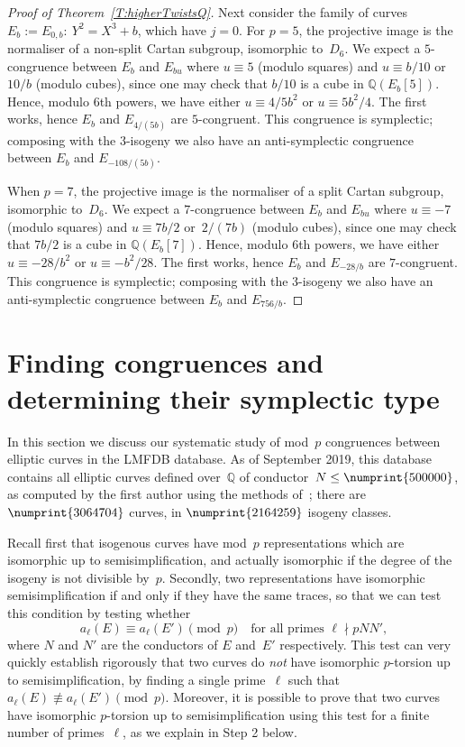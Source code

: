 \documentclass[twoside,leqno,symbols-for-thanks, draft]{rmi}
\numberwithin{equation}{section}
\newcommand{\Q}{\mathbb{Q}}
\theoremstyle{remark}
\begin{document}
\begin{proof}[Proof of Theorem~\ref{T:higherTwistsQ}]
Next consider the family of curves $E_b:=E_{0,b}:\ Y^2=X^3+b$, which
have $j=0$. For $p=5$, the projective image is the normaliser of a
non-split Cartan subgroup, isomorphic to~$D_6$.  We expect a $5$-congruence
between $E_b$ and $E_{bu}$ where $u\equiv5$ (modulo squares) and
$u\equiv b/10$ or~$10/b$ (modulo cubes), since one may check that
$b/10$ is a cube in $\Q(E_b[5])$.  Hence, modulo $6$th powers, we have
either $u\equiv 4/5b^2$ or $u\equiv 5b^2/4$.  The first works, hence
$E_b$ and $E_{4/(5b)}$ are $5$-congruent.  This congruence is
symplectic; composing with the $3$-isogeny we also have an
anti-symplectic congruence between $E_b$ and $E_{-108/(5b)}$.

When $p=7$, the projective image is the normaliser of a split Cartan
subgroup, isomorphic to~$D_6$.  We expect a $7$-congruence between
$E_b$ and $E_{bu}$ where $u\equiv-7$ (modulo squares) and $u\equiv
7b/2$ or~$2/(7b)$ (modulo cubes), since one may check that $7b/2$ is a
cube in $\Q(E_b[7])$.  Hence, modulo $6$th powers, we have either
$u\equiv -28/b^2$ or $u\equiv -b^2/28$.  The first works, hence $E_b$
and $E_{-28/b}$ are $7$-congruent.  This congruence is symplectic;
composing with the $3$-isogeny we also have an anti-symplectic
congruence between $E_b$ and $E_{756/b}$.
\end{proof}

\section{Finding congruences and determining their symplectic type}\label{S:statistics}

In this section we discuss our systematic study of mod~$p$ congruences
between elliptic curves in the LMFDB database.  As of September 2019, this
database contains all elliptic curves defined over~$\Q$ of
conductor~$N\le\numprint{500000}$, as computed by the first author
using the methods of~\cite{AMEC}; there are $\numprint{3064704}$
curves, in $\numprint{2164259}$ isogeny classes.


Recall first that isogenous curves have mod~$p$ representations which
are isomorphic up to semisimplification, and actually isomorphic if
the degree of the isogeny is not divisible by~$p$.  Secondly, two
representations have isomorphic semisimplification if and only if they
have the same traces, so that we can test this condition by testing
whether
\[ a_{\ell}(E)\equiv a_{\ell}(E')\pmod{p}
\quad \text{for all primes } \ell \nmid pNN',
\] 
where $N$ and $N'$ are the conductors of $E$
and~$E'$ respectively.  This test can very quickly establish rigorously
that two curves do \emph{not} have isomorphic $p$-torsion up to
semisimplification, by finding  a single
prime~$\ell$ such that $a_{\ell}(E)\not\equiv a_{\ell}(E')\pmod{p}$.
Moreover, it is possible to prove that two curves have isomorphic $p$-torsion up to
semisimplification using this test for a finite number of
primes~$\ell$, as we explain in Step 2 below.
\end{document}
